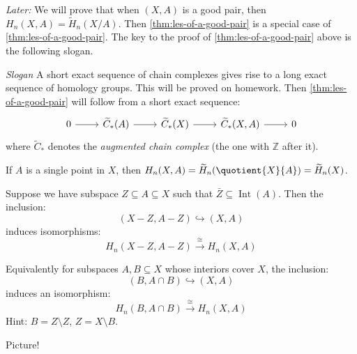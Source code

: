 \emph{Later:} We will prove that when $(X, A)$ is a good pair, then $H_n(X, A) = \widetilde{H}_n(X/A)$. Then \autoref{thm:les-of-a-good-pair}
is a special case of \autoref{thm:les-of-a-good-pair}. The key to the proof of \autoref{thm:les-of-a-good-pair} above is the following slogan.

\begin{remark}
	\emph{Slogan} A short exact sequence of chain complexes gives rise to a long exact sequence of homology groups. This will be proved on homework.
	Then \autoref{thm:les-of-a-good-pair} will follow from a short exact sequence:
	\[\begin{tikzcd}
			0 & {\widetilde{C}_\ast(A)} & {\widetilde{C}_\ast(X)} & {\widetilde{C}_\ast(X, A)} & 0
			\arrow[from=1-1, to=1-2]
			\arrow[from=1-2, to=1-3]
			\arrow[from=1-3, to=1-4]
			\arrow[from=1-4, to=1-5]
		\end{tikzcd}\]
	where $\widetilde{C}_\ast$ denotes the \emph{augmented chain complex} (the one with $\mathbb{Z}$ after it).
\end{remark}

\begin{exercise}
	If $A$ is a single point in $X$, then $H_n(X, A) = \widetilde{H}_n(\quotient{X}{A}) = \widetilde{H}_n(X)$.
\end{exercise}

\begin{theorem}[Excision]\label{thm:excision}
	Suppose we have subspace $Z \subseteq A \subseteq X$ such that $\bar{Z} \subseteq \operatorname{Int} (A)$. Then the inclusion:
	\[
		(X - Z, A - Z) \hookrightarrow (X, A)
	\]
	induces isomorphisms:
	\[
		H_n(X - Z, A - Z) \xrightarrow{\cong} H_n(X, A)
	\]
\end{theorem}

\begin{exercise}
	Equivalently for subspaces $A, B \subseteq X$ whose interiors cover $X$, the inclusion:
	\[
		(B, A \cap B) \hookrightarrow (X, A)
	\]
	induces an isomorphism:
	\[
		H_n(B, A \cap B) \xrightarrow{\cong} H_n(X, A)
	\]
	Hint: $B = Z \setminus Z$, $Z = X \setminus B$.
\end{exercise}
Picture!
\begin{figure}[H]
	\centering
	\label{fig:eg:excision-1}
\end{figure}

